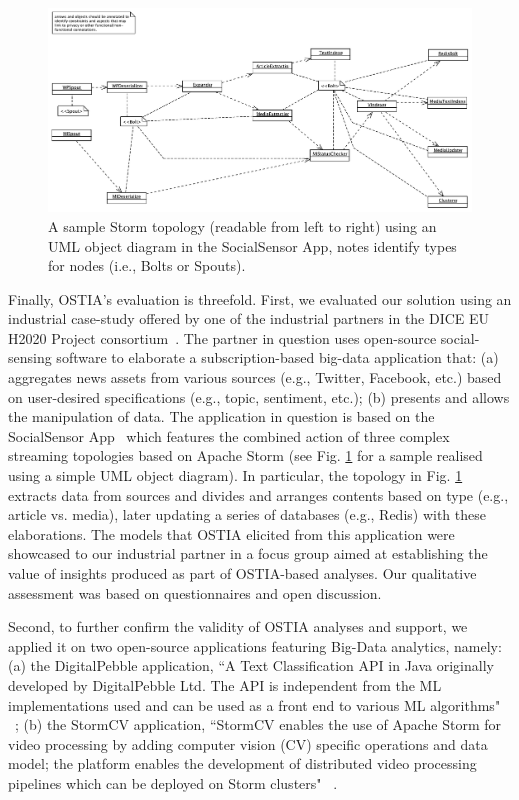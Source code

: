 \begin{figure}
  \centering
  \includegraphics[width=12cm]{images/socialsensorother}
  \caption{A sample Storm topology (readable from left to right) using an UML object diagram in the SocialSensor App, notes identify types for nodes (i.e., Bolts or Spouts).}
  \label{socialsensor-topology}
\end{figure}

Finally, OSTIA's evaluation is threefold. First, we evaluated our solution
using an industrial case-study offered by one of the industrial partners in the
DICE EU H2020 Project consortium~\cite{dice2020}.
The
partner in question uses open-source social-sensing software to elaborate a
subscription-based big-data application that: (a) aggregates news assets from
various sources (e.g., Twitter, Facebook, etc.) based on user-desired
specifications (e.g., topic, sentiment, etc.); (b) presents and allows the
manipulation of data. The application in question is based on the SocialSensor
App~\cite{socialsensor}
which features the combined
action of three complex streaming topologies based on Apache Storm (see
Fig. \ref{socialsensor-topology} for a sample realised using a simple UML object diagram).  In particular, the topology in
Fig. \ref{socialsensor-topology} extracts data from sources and divides and arranges contents based on type (e.g., article vs. media),
later updating a series of databases (e.g., Redis) with these elaborations. The
models that OSTIA elicited from this application were showcased to our
industrial partner in a focus group aimed at establishing the value of insights
produced as part of OSTIA-based analyses. Our qualitative assessment was based
on questionnaires and open discussion.

Second, to further confirm the validity of OSTIA analyses and support, we
applied it on two open-source applications featuring Big-Data analytics, namely: (a) the DigitalPebble application,
``A Text Classification API in Java originally developed by DigitalPebble Ltd. The
API is independent from the ML implementations used and can be used as a front
end to various ML algorithms" ~\cite{storm-crawler}; (b) the StormCV application, 
``StormCV
enables the use of Apache Storm for video processing by adding computer vision
(CV) specific operations and data model; the platform enables the development of
distributed video processing pipelines which can be deployed on Storm clusters" ~\cite{stormCV}.

